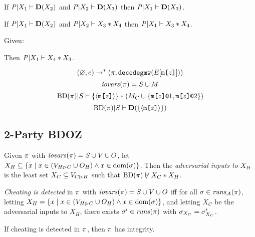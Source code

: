 \begin{lemma}
  If $\condp{\pmf}{X_1}{\detx{X_2}}$ and
  $\condp{\pmf}{X_2}{\detx{X_3}}$ then $\condp{\pmf}{X_1}{\detx{X_3}}$.
\end{lemma}

\begin{lemma}
  If $\condp{\pmf}{X_1}{\detx{X_2}}$ and
  $\condsep{\pmf}{X_2}{X_3}{X_4}$ then $\condsep{\pmf}{X_1}{X_3}{X_4}$.
\end{lemma}

\begin{lemma}
  Given:
  \begin{mathpar}
    

  \end{mathpar}
    Then $\condsep{\pmf}{X_1}{X_4}{X_3}$.
\end{lemma}

\begin{lemma}
  $$ (\varnothing,e) \redxs (\prog,\decodegmw(E[\mesg{z}])) $$
  $$\iov(\prog) = S \cup M$$
  $$\condsep{\progtt(\prog)}{S}{\{\macgv{\mesg{z}}\}}{(M_C \cup \{ \elab{\mesg{z}}{1}, \elab{\mesg{z}}{2} \})}$$
  $$\conddetx{\progtt(\prog)}{S}{\{\macgv{\mesg{z}}\}}$$
\end{lemma}

\begin{mathpar}
  
  
\end{mathpar}

\subsection{2-Party BDOZ}




\begin{definition}
  Given $\prog$ with $\iov(\prog) = S \cup V \cup O$,
  let $X_H \subseteq \{ x \mid x \in (\houtputs \cup O_H) \wedge x \in \dom(\store) \}$.
  Then the \emph{adversarial inputs to $X_H$} is the least set
  $X_C \subseteq \cinputs$ such that $\progtt(\prog) \not\vdash X_C * X_H$.
\end{definition}
\begin{definition}
  \emph{Cheating is detected} in $\prog$ with $\iov(\prog) = S \cup V \cup O$ iff
  for all  $\store \in \aruns(\prog)$,
  letting $X_H = \{ x \mid x \in (\houtputs \cup O_H) \wedge x \in \dom(\store) \}$,
  and letting $X_C$ be the adversarial inputs to $X_H$,
  there exists $\sigma'\in \runs(\prog)$
  with $\store_{X_C} = \store'_{X_C}$.  
\end{definition}

\begin{lemma}
  If cheating is detected in $\prog$, then $\prog$ has integrity.
\end{lemma}
